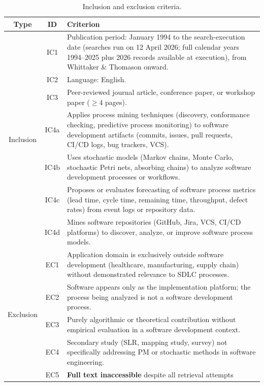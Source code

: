 \begin{table}[H]
\centering
\caption{Inclusion and exclusion criteria.}
\label{tab:criteria}
\small
\setlength{\tabcolsep}{4pt}
\begin{tabular}{c c p{10.2cm}}
\toprule
\textbf{Type} & \textbf{ID} & \textbf{Criterion} \\
\midrule
\multirow{7}{*}{Inclusion}
& IC1  & Publication period: January 1994 to the search-execution date
          (searches run on 12 April 2026; full calendar years 1994--2025 plus
          2026 records available at execution), from Whittaker \& Thomason
          onward. \\
& IC2  & Language: English. \\
& IC3  & Peer-reviewed journal article, conference paper, or workshop paper
          ($\geq$4 pages). \\
& IC4a & Applies process mining techniques (discovery, conformance checking,
          predictive process monitoring) to software development artifacts
          (commits, issues, pull requests, CI/CD logs, bug trackers, VCS). \\
& IC4b & Uses stochastic models (Markov chains, Monte Carlo, stochastic Petri
          nets, absorbing chains) to analyze software development processes or
          workflows. \\
& IC4c & Proposes or evaluates forecasting of software process metrics (lead
          time, cycle time, remaining time, throughput, defect rates) from
          event logs or repository data. \\
& IC4d & Mines software repositories (GitHub, Jira, VCS, CI/CD platforms) to
          discover, analyze, or improve software process models. \\
\midrule
\multirow{7}{*}{Exclusion}
& EC1  & Application domain is exclusively outside software development
          (healthcare, manufacturing, supply chain) without demonstrated
          relevance to SDLC processes. \\
& EC2  & Software appears only as the implementation platform; the process
          being analyzed is not a software development process. \\
& EC3  & Purely algorithmic or theoretical contribution without empirical
          evaluation in a software development context. \\
& EC4  & Secondary study (SLR, mapping study, survey) not specifically
          addressing PM or stochastic methods in software engineering. \\
& EC5  & \textbf{Full text inaccessible} despite all retrieval attempts

\end{tabular}
\end{table}
